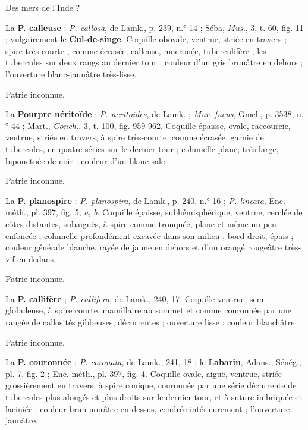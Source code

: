 \documentclass[a4paper, 11pt, oneside, polutonikogreek, french]{article}
\begin{document}
Des mers de l'Inde ?

\bigskip

La \textbf{P. calleuse} : \emph{P. callosa}, de Lamk., p. 239, n.° 14 ; Séba, \emph{Mus.}, 3, t. 60, fig. 11 ; vulgairement le \textbf{Cul-de-singe}. Coquille obovale, ventrue, striée en travers ; spire très-courte , comme écrasée, calleuse, mucronée, tuberculifère ; les tubercules sur deux rangs au dernier tour ; couleur d'un gris brunâtre en dehors ; l'ouverture blanc-jaunâtre très-lisse.

Patrie inconnue.

\bigskip

La \textbf{Pourpre néritoïde} : \emph{P. neritoides}, de Lamk. ; \emph{Mur. fucus}, Gmel., p. 3538, n.° 44 ; Mart., \emph{Conch.}, 3, t. 100, fig. 959-962. Coquille épaisse, ovale, raccourcie, ventrue, striée en travers, à spire très-courte, comme écrasée, garnie de tubercules, en quatre séries sur le dernier tour ; columelle plane, très-large, biponctuée de noir : couleur d'un blanc sale.

Patrie inconnue.

\bigskip

La \textbf{P. planospire} : \emph{P. planospira}, de Lamk., p. 240, n.° 16 ; \emph{P. lineata}, Enc. méth., pl. 397, fig. 5, \emph{a}, \emph{b}. Coquille épaisse, subhémisphérique, ventrue, cerclée de côtes distantes, subaiguës, à spire comme tronquée, plane et même un peu enfoncée ; columelle profondément excavée dans son milieu ; bord droit, épais ; couleur générale blanche, rayée de jaune en dehors et d'un orangé rougeâtre très-vif en dedans.

Patrie inconnue.

\bigskip

La \textbf{P. callifère} ; \emph{P. callifera}, de Lamk., 240, 17. Coquille ventrue, semi-globuleuse, à spire courte, mamillaire au sommet et comme couronnée par une rangée de callosités gibbeuses, décurrentes ; ouverture lisse : couleur blanchâtre.

Patrie inconnue.

\bigskip

La \textbf{P. couronnée} : \emph{P. coronata}, de Lamk., 241, 18 ; le \textbf{Labarin}, Adans., Sénég., pl. 7, fig. 2 ; Enc. méth., pl. 397, fig. 4. Coquille ovale, aiguë, ventrue, striée grossièrement en travers, à spire conique, couronnée par une série décurrente de tubercules plus alongés et plus droits sur le dernier tour, et à suture imbriquée et laciniée : couleur brun-noirâtre en dessus, cendrée intérieurement ; l'ouverture jaunâtre.
\end{document}
